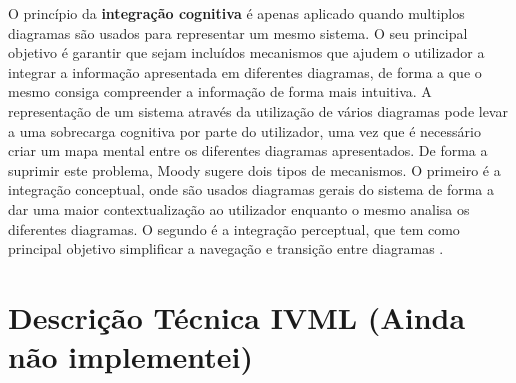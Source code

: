 O princípio da \textbf{integração cognitiva} é apenas aplicado quando multiplos diagramas são usados para representar um mesmo sistema. O seu principal objetivo é garantir que sejam incluídos mecanismos que ajudem o utilizador a integrar a informação apresentada em diferentes diagramas, de forma a que o mesmo consiga compreender a informação de forma mais intuitiva. A representação de um sistema através da utilização de vários diagramas pode levar a uma sobrecarga cognitiva por parte do utilizador, uma vez que é necessário criar um mapa mental entre os diferentes diagramas apresentados. De forma a suprimir este problema, Moody sugere dois tipos de mecanismos. O primeiro é a integração conceptual, onde são usados diagramas gerais do sistema de forma a dar uma maior contextualização ao utilizador enquanto o mesmo analisa os diferentes diagramas. O segundo é a integração perceptual, que tem como principal objetivo simplificar a navegação e transição entre diagramas \cite{moody2009physics}.



\section{Descrição Técnica IVML (Ainda não implementei)} %
\label{sec:esp_ivml}


